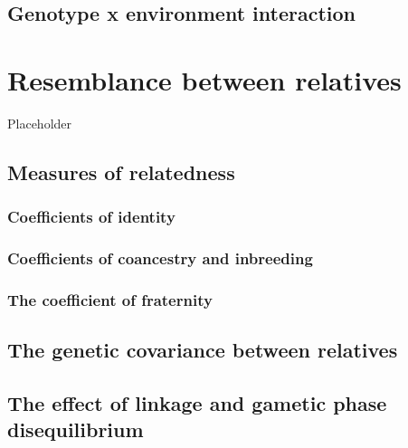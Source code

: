 \documentclass[
]{book}
\begin{document}
\hypertarget{genotype-x-environment-interaction}{%
\section{Genotype x environment interaction}\label{genotype-x-environment-interaction}}

\hypertarget{resemblance-between-relatives}{%
\chapter{Resemblance between relatives}\label{resemblance-between-relatives}}

Placeholder

\hypertarget{measures-of-relatedness}{%
\section{Measures of relatedness}\label{measures-of-relatedness}}

\hypertarget{coefficients-of-identity}{%
\subsection{Coefficients of identity}\label{coefficients-of-identity}}

\hypertarget{coefficients-of-coancestry-and-inbreeding}{%
\subsection{Coefficients of coancestry and inbreeding}\label{coefficients-of-coancestry-and-inbreeding}}

\hypertarget{the-coefficient-of-fraternity}{%
\subsection{The coefficient of fraternity}\label{the-coefficient-of-fraternity}}

\hypertarget{the-genetic-covariance-between-relatives}{%
\section{The genetic covariance between relatives}\label{the-genetic-covariance-between-relatives}}

\hypertarget{the-effect-of-linkage-and-gametic-phase-disequilibrium}{%
\section{The effect of linkage and gametic phase disequilibrium}\label{the-effect-of-linkage-and-gametic-phase-disequilibrium}}
\end{document}

